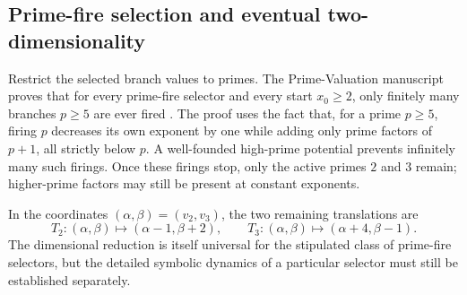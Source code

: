 \documentclass[11pt,a4paper]{article}
\theoremstyle{definition}\newtheorem{definition}[theorem]{Definition}
\begin{document}
\subsection{Prime-fire selection and eventual two-dimensionality}\label{sec:primefire}
Restrict the selected branch values to primes. The Prime-Valuation manuscript proves that for every prime-fire selector and every start $x_0\ge2$, only finitely many branches $p\ge5$ are ever fired \cite{prime}. The proof uses the fact that, for a prime $p\ge5$, firing $p$ decreases its own exponent by one while adding only prime factors of $p+1$, all strictly below $p$. A well-founded high-prime potential prevents infinitely many such firings. Once these firings stop, only the active primes $2$ and $3$ remain; higher-prime factors may still be present at constant exponents.

In the coordinates $(\alpha,\beta)=(v_2,v_3)$, the two remaining translations are
\begin{equation}\label{eq:two-vectors}
T_2:(\alpha,\beta)\mapsto(\alpha-1,\beta+2),\qquad
T_3:(\alpha,\beta)\mapsto(\alpha+4,\beta-1).
\end{equation}
The dimensional reduction is itself universal for the stipulated class of prime-fire selectors, but the detailed symbolic dynamics of a particular selector must still be established separately.
\end{document}
